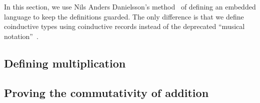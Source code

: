 In this section, we use Nils Anders Danielsson's
method~\cite{danielsson-beating} of defining an embedded language to keep the
definitions guarded. The only difference is that we define coinductive types
using coinductive records instead of the deprecated ``musical
notation''~\cite{agda-coinduction}.

\subsection{Defining multiplication}\label{sec:dsl-mul}


\subsection{Proving the commutativity of addition}\label{sec:dsl-comm}


